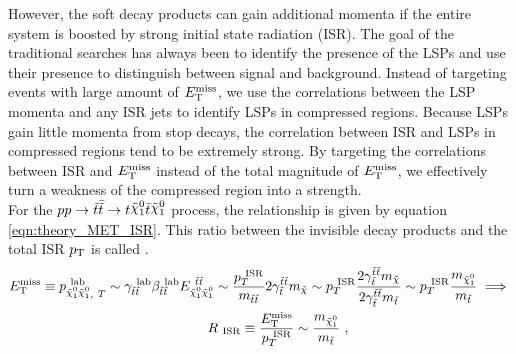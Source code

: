 
\indent However, the soft decay products can gain additional momenta if the entire system is boosted by strong initial state radiation (ISR).  The goal of the traditional searches has always been to identify the presence of the LSPs and use their presence to distinguish between signal and background.  Instead of targeting events with large amount of $E_{\mathrm{T}}^{\mathrm{miss}}$, we use the correlations between the LSP momenta and any ISR jets to identify LSPs in compressed regions.\cite{Pheno1,Pheno2}  Because LSPs gain little momenta from stop decays, the correlation between ISR and LSPs in compressed regions tend to be extremely strong.  By targeting the correlations between ISR and $E_{\mathrm{T}}^{\mathrm{miss}}$ instead of the total magnitude of $E_{\mathrm{T}}^{\mathrm{miss}}$, we effectively turn a weakness of the compressed region into a strength. \\

\indent For the $p p \rightarrow \antibar{\stop} \rightarrow t\ninoone\tbar\ninoone$ process, the relationship is given by equation \ref{eqn:theory_MET_ISR}. This ratio between the invisible decay products and the total ISR $p_{\mathrm{T}}$ is called \RISR. \\

\begin{align}
\MET \equiv p_{\ninoone\ninoone,~T}^{~\mathrm{lab}} \sim \gamma_{\stop\stop}^{~\mathrm{lab}} \beta_{\stop\stop}^{~\mathrm{lab}} E_{\ninoone\ninoone}^{~\stop\stop} 
\sim \frac{\PTISR}{m_{\stop\stop}} 2\gamma_{\stop}^{\stop\stop} m_{\tilde{\chi}} \sim
\PTISR \frac{ 2\gamma_{\stop}^{\stop\stop} m_{\tilde{\chi}} }{ 2\gamma_{\stop}^{\stop\stop} m_{\stop} } \sim
\PTISR \frac{m_{\ninoone}}{m_{\stop}}\implies\\
\RISR \equiv \frac{\MET}{\PTISR} \sim \frac{m_{\ninoone}}{m_{\stop}}~,\quad\quad\quad\quad\quad\quad\quad\quad\quad\quad\quad\quad
\label{eqn:theory_MET_ISR}
\end{align}


